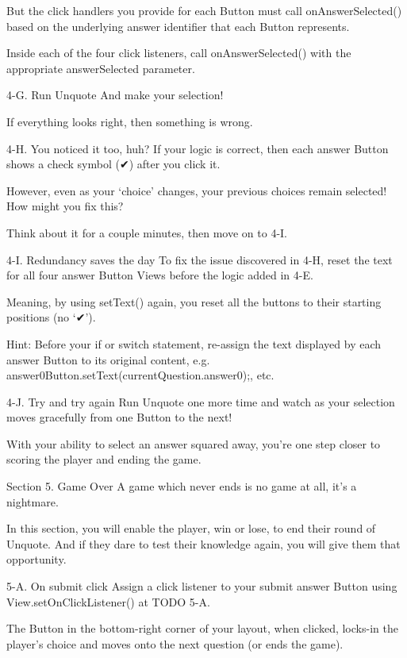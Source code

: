                 But the click handlers you provide for each Button must call onAnswerSelected() based on the underlying answer identifier that each Button represents.

                Inside each of the four click listeners, call onAnswerSelected() with the appropriate answerSelected parameter.

        4-G. Run Unquote
                And make your selection!

                If everything looks right, then something is wrong.

        4-H. You noticed it too, huh?
                If your logic is correct, then each answer Button shows a check symbol (✔) after you click it.

                However, even as your ‘choice’ changes, your previous choices remain selected! How might you fix this?

                Think about it for a couple minutes, then move on to 4-I.

        4-I. Redundancy saves the day
                To fix the issue discovered in 4-H, reset the text for all four answer Button Views before the logic added in 4-E.

                Meaning, by using setText() again, you reset all the buttons to their starting positions (no ‘✔’).

                        Hint: Before your if or switch statement, re-assign the text displayed by each answer Button to its original content, e.g. answer0Button.setText(currentQuestion.answer0);, etc.

        4-J. Try and try again
                Run Unquote one more time and watch as your selection moves gracefully from one Button to the next!

                With your ability to select an answer squared away, you’re one step closer to scoring the player and ending the game.

Section 5. Game Over
                A game which never ends is no game at all, it’s a nightmare.

                In this section, you will enable the player, win or lose, to end their round of Unquote. And if they dare to test their knowledge again, you will give them that opportunity.

        5-A. On submit click
                Assign a click listener to your submit answer Button using View.setOnClickListener() at TODO 5-A.

                The Button in the bottom-right corner of your layout, when clicked, locks-in the player’s choice and moves onto the next question (or ends the game).

